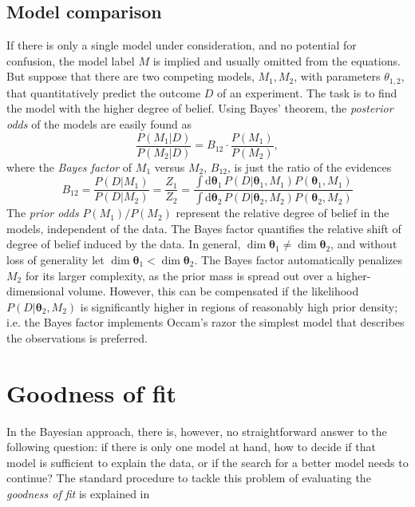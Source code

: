 \documentclass[
11pt,
a4paper,
bibliography=totoc,
captions=nooneline, %
numbers=noenddot,
twoside]{scrbook}
\newcommand{\fred}[1]{{\todo[color=orange]{Fred: #1}}}
\newcommand\rmdx[1]{\mbox{d}#1\,} %
\newcommand{\scath}{\theta} %
\newcommand{\vecth}{\bm{\theta}} %
\begin{document}
\subsection{Model comparison} \label{sec:model-comparison}

If there is only a single model under consideration, and no potential for
confusion, the model label $M$ is implied and usually omitted from the
equations. But suppose that there are two competing models, $M_1, M_2$, with
parameters $\scath_{1,2}$, that quantitatively predict the outcome $D$ of an
experiment. The task is to find the model with the higher degree of
belief. Using Bayes' theorem, the \emph{posterior odds} of the models are easily
found as
\begin{equation}
  \label{eq:post-odds}
  \frac{P(M_1|D)}{P(M_2|D)}
   = B_{12}  \cdot  \frac{P(M_1)}{P(M_2)},
\end{equation}
 where the \emph{Bayes factor} of $M_1$ versus $M_2$, $B_{12}$, is just the ratio
of the evidences
\begin{equation}
  \label{eq:Bayes-factor}
  B_{12}= \dfrac{P(D|M_1)}{P(D|M_2)} = \frac{Z_1}{Z_2}
  = \frac{\int \rmdx{\vecth_1} P(D|\vecth_1, M_1) P(\vecth_1, M_1)}
  {\int \rmdx{ \vecth_2} P(D|\vecth_2, M_2) P(\vecth_2, M_2)}
\end{equation}
The \emph{prior odds} $P(M_1)/P(M_2)$ represent the relative degree of belief
in the models, independent of the data.
The Bayes factor quantifies the relative shift of degree of belief
induced by the data. In general, $\dim \vecth_1 \ne \dim \vecth_2$,
and without loss of generality let $\dim \vecth_1 < \dim
\vecth_2$. The Bayes factor automatically penalizes $M_2$ for its
larger complexity, as the prior mass is spread out over a
higher-dimensional volume. However, this can be compensated if the
likelihood $P(D|\vecth_2, M_2)$ is significantly higher in regions of
reasonably high prior density; i.e. the Bayes factor implements
Occam's razor the simplest model that describes the observations is
preferred.

\section{Goodness of fit} \label{sec:goodness-fit}
In the Bayesian approach, there is, however, no straightforward answer to the
following question: if there is only one model at hand, how to decide if that
model is sufficient to explain the data, or if the search for a better model
needs to continue?  The standard procedure to tackle this problem of evaluating
the \emph{goodness of fit} is explained in \fred{expand}
\end{document}
